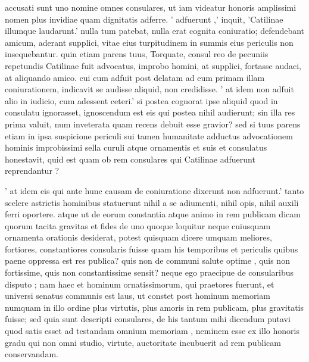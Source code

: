  accusati sunt uno nomine omnes consulares, ut iam videatur honoris amplissimi nomen plus invidiae quam dignitatis adferre. ' adfuerunt ,' inquit, 'Catilinae illumque laudarunt.' nulla tum patebat, nulla erat cognita coniuratio; defendebant amicum, aderant supplici, vitae eius turpitudinem in summis eius periculis non insequebantur. quin etiam parens tuus, Torquate, consul reo de pecuniis repetundis Catilinae fuit advocatus, improbo homini, at supplici, fortasse audaci, at aliquando amico. cui cum adfuit post delatam ad eum primam illam coniurationem, indicavit se audisse aliquid, non credidisse. ' at idem non adfuit alio in iudicio, cum adessent ceteri.' si postea cognorat ipse aliquid quod in consulatu ignorasset, ignoscendum est eis qui postea nihil audierunt; sin illa res prima valuit, num inveterata quam recens debuit esse gravior? sed si tuus parens etiam in ipsa suspicione periculi sui tamen humanitate adductus advocationem hominis improbissimi sella curuli atque ornamentis et suis et consulatus honestavit, quid est quam ob rem consulares qui Catilinae adfuerunt reprendantur ?

 ' at idem eis qui ante hunc causam de coniuratione dixerunt non adfuerunt.' tanto scelere astrictis hominibus statuerunt nihil a se adiumenti, nihil opis, nihil auxili ferri oportere. atque ut de eorum constantia atque animo in rem publicam dicam quorum tacita gravitas et fides de uno quoque loquitur neque cuiusquam ornamenta orationis desiderat, potest quisquam dicere umquam meliores, fortiores, constantiores consularis fuisse quam his temporibus et periculis quibus paene oppressa est res publica? quis non de communi salute optime , quis non fortissime, quis non constantissime sensit? neque ego praecipue de consularibus disputo ; nam haec et hominum ornatissimorum, qui praetores fuerunt, et universi senatus communis est laus, ut constet post hominum memoriam numquam in illo ordine plus virtutis, plus amoris in rem publicam, plus gravitatis fuisse; sed quia sunt descripti consulares, de his tantum mihi dicendum putavi quod satis esset ad testandam omnium memoriam , neminem esse ex illo honoris gradu qui non omni studio, virtute, auctoritate incubuerit ad rem publicam conservandam.

